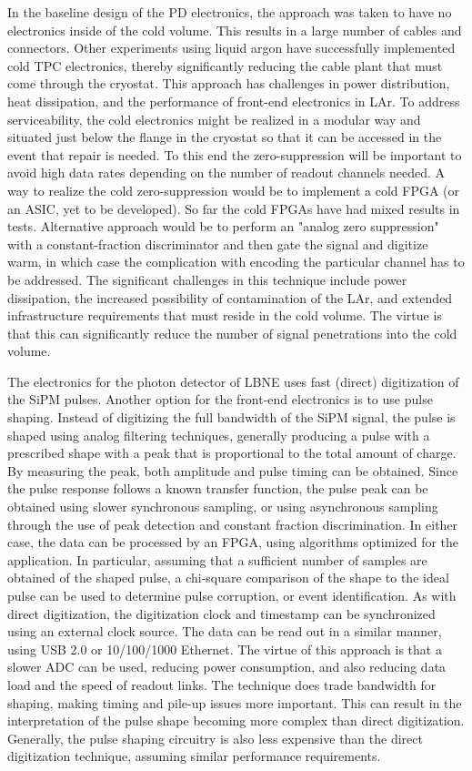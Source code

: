 In the baseline design of the PD electronics, the approach was taken
to have no electronics inside of the cold volume.  This results in a
large number of cables and connectors.  Other experiments using liquid
argon have successfully implemented cold TPC electronics, thereby
significantly reducing the cable plant that must come through the
cryostat.  This approach has challenges in power distribution, heat
dissipation, and the performance of front-end electronics in LAr. To
address serviceability, the cold electronics might be realized in a
modular way and situated just below the flange in the cryostat so that
it can be accessed in the event that repair is needed.  To this end
the zero-suppression will be important to avoid high data rates
depending on the number of readout channels needed. A way to realize
the cold zero-suppression would be to implement a cold FPGA (or an
ASIC, yet to be developed).  So far the cold FPGAs have had mixed
results in tests. Alternative approach would be to perform an "analog
zero suppression" with a constant-fraction discriminator and then gate
the signal and digitize warm, in which case the complication with
encoding the particular channel has to be addressed.  The significant
challenges in this technique include power dissipation, the increased
possibility of contamination of the LAr, and extended infrastructure
requirements that must reside in the cold volume.  The virtue is that
this can significantly reduce the number of signal penetrations into
the cold volume.

The electronics for the photon detector of LBNE uses fast (direct)
digitization of the SiPM pulses. Another option for the front-end
electronics is to use pulse shaping. Instead of digitizing the full
bandwidth of the SiPM signal, the pulse is shaped using analog
filtering techniques, generally producing a pulse with a prescribed
shape with a peak that is proportional to the total amount of charge.
By measuring the peak, both amplitude and pulse timing can be
obtained.  Since the pulse response follows a known transfer function,
the pulse peak can be obtained using slower synchronous sampling, or
using asynchronous sampling through the use of peak detection and
constant fraction discrimination.  In either case, the data can be
processed by an FPGA, using algorithms optimized for the application.
In particular, assuming that a sufficient number of samples are
obtained of the shaped pulse, a chi-square comparison of the shape to
the ideal pulse can be used to determine pulse corruption, or event
identification.  As with direct digitization, the digitization clock
and timestamp can be synchronized using an external clock source. The
data can be read out in a similar manner, using USB 2.0 or 10/100/1000
Ethernet.  The virtue of this approach is that a slower ADC can be
used, reducing power consumption, and also reducing data load and the
speed of readout links.  The technique does trade bandwidth for
shaping, making timing and pile-up issues more important.  This can
result in the interpretation of the pulse shape becoming more complex
than direct digitization.  Generally, the pulse shaping circuitry is
also less expensive than the direct digitization technique, assuming
similar performance requirements.


